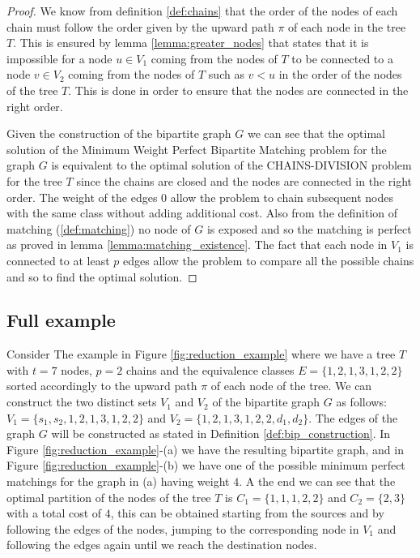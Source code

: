 \begin{proof}
    We know from definition \ref{def:chains} that the order of the nodes of each chain must follow the order given by the upward path $\pi$ of each node in the tree $T$. This is ensured by lemma \ref{lemma:greater_nodes} that states that it is impossible for a node $u \in V_1$ coming from the nodes of $T$ to be connected to a node $v \in V_2$ coming from the nodes of $T$ such as $v < u$ in the order of the nodes of the tree $T$. This is done in order to ensure that the nodes are connected in the right order.

    Given the construction of the bipartite graph $G$ we can see that the optimal solution of the Minimum Weight Perfect Bipartite Matching problem for the graph $G$ is equivalent to the optimal solution of the \textsc{CHAINS-DIVISION} problem for the tree $T$ since the chains are closed and the nodes are connected in the right order. The weight of the edges $0$ allow the problem to chain subsequent nodes with the same class without adding additional cost. Also from the definition of matching (\ref{def:matching}) no node of $G$ is exposed and so the matching is perfect as proved in lemma \ref{lemma:matching_existence}. The fact that each node in $V_1$ is connected to at least $p$ edges allow the problem to compare all the possible chains and so to find the optimal solution.
\end{proof}

\subsection{Full example}
Consider The example in Figure \ref{fig:reduction_example} where we have a tree $T$ with $t=7$ nodes, $p = 2$ chains and the equivalence classes $E = \{1,2,1,3,1,2,2\}$ sorted accordingly to the upward path $\pi$ of each node of the tree. We can construct the two distinct sets $V_1$ and $V_2$ of the bipartite graph $G$ as follows: $V_1 = \{s_1, s_2, 1,2,1,3,1,2,2\}$ and $V_2 = \{1,2,1,3,1,2,2, d_1, d_2\}$. The edges of the graph $G$ will be constructed as stated in Definition \ref{def:bip_construction}. In Figure \ref{fig:reduction_example}-(a) we have the resulting bipartite graph, and in Figure \ref{fig:reduction_example}-(b) we have one of the possible minimum perfect matchings for the graph in (a) having weight $4$. A the end we can see that the optimal partition of the nodes of the tree $T$ is $C_1 = \{1,1,1,2,2\}$ and $C_2 = \{2,3\}$ with a total cost of $4$, this can be obtained starting from the sources and by following the edges of the nodes, jumping to the corresponding node in $V_1$ and following the edges again until we reach the destination nodes.

